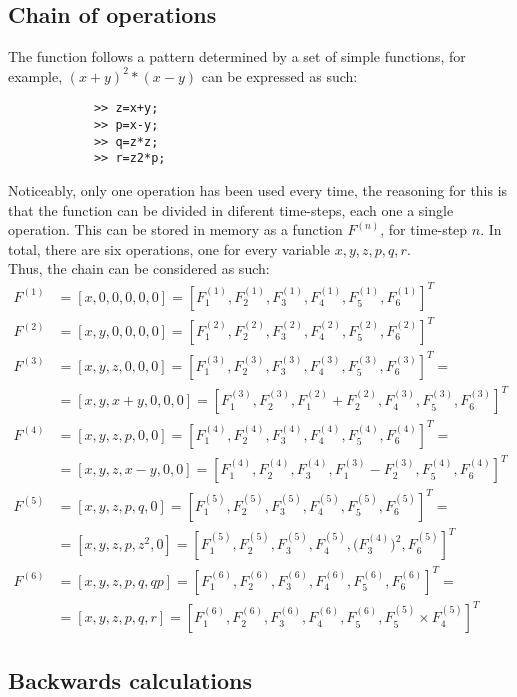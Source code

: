 \documentclass[titlepage]{article}
\theoremstyle{plain}
\theoremstyle{definition}
\begin{document}
		\subsection{Chain of operations}
		
		The function follows a pattern determined by a set of simple functions, for example, $(x+y)^2*(x-y)$ can be expressed as such:
		
		\begin{verbatim}
			>> z=x+y;
			>> p=x-y;
			>> q=z*z;
			>> r=z2*p;
		\end{verbatim}
		Noticeably, only one operation has been used every time, the reasoning for this is that the function can be divided in diferent time-steps, each one a single operation. This can be stored in memory as a function $F^{(n)}$, for time-step $n$. In total, there are six operations, one for every variable $x, y, z, p, q, r$.\\
		Thus, the chain can be considered as such:
		\begin{align}
		F^{(1)} & = [x,0,0,0,0,0] = 						[F^{(1)}_1,F^{(1)}_2,F^{(1)}_3,F^{(1)}_4,F^{(1)}_5,F^{(1)}_6]^T\\
		F^{(2)} & = [x,y,0,0,0,0] = 						[F^{(2)}_1,F^{(2)}_2,F^{(2)}_3,F^{(2)}_4,F^{(2)}_5,F^{(2)}_6]^T\\
		F^{(3)} & = [x,y,z,0,0,0] = 						[F^{(3)}_1,F^{(3)}_2,F^{(3)}_3,F^{(3)}_4,F^{(3)}_5,F^{(3)}_6]^T = \\ & 
		= [x,y,x+y,0,0,0] = [F^{(3)}_1,F^{(3)}_2,F^{(2)}_1+F^{(2)}_2,F^{(3)}_4,F^{(3)}_5,F^{(3)}_6]^T\\
		F^{(4)} & = [x,y,z,p,0,0] = 						[F^{(4)}_1,F^{(4)}_2,F^{(4)}_3,F^{(4)}_4,F^{(4)}_5,F^{(4)}_6]^T = \\ & 
		= [x,y,z,x-y,0,0] = [F^{(4)}_1,F^{(4)}_2,F^{(4)}_3,F^{(3)}_1-F^{(3)}_2,F^{(4)}_5,F^{(4)}_6]^T\\
		F^{(5)} & = [x,y,z,p,q,0] = 						[F^{(5)}_1,F^{(5)}_2,F^{(5)}_3,F^{(5)}_4,F^{(5)}_5,F^{(5)}_6]^T = \\ & 
		= [x,y,z,p,z^2,0] = 						[F^{(5)}_1,F^{(5)}_2,F^{(5)}_3,F^{(5)}_4,\big(F^{(4)}_3\big)^2,F^{(5)}_6]^T\\	
		F^{(6)} & = [x,y,z,p,q,qp] = 						[F^{(6)}_1,F^{(6)}_2,F^{(6)}_3,F^{(6)}_4,F^{(6)}_5,F^{(6)}_6]^T = \\ & 
		= [x,y,z,p,q,r] = 						[F^{(6)}_1,F^{(6)}_2,F^{(6)}_3,F^{(6)}_4,F^{(6)}_5,F^{(5)}_5 \times F^{(5)}_4]^T	
		\end{align}
		
		\subsection{Backwards calculations} \label{BwdsCalcs}
		
\end{document}
